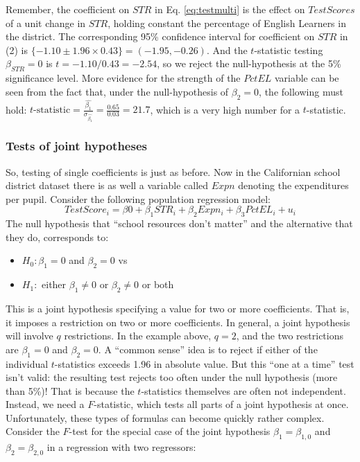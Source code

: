 \documentclass[
]{book}
\providecommand{\tightlist}{%
  \setlength{\itemsep}{0pt}\setlength{\parskip}{0pt}}
\begin{document}
Remember, the coefficient on \(STR\) in Eq. \eqref{eq:testmulti} is the effect on \(TestScores\) of a unit change in \(STR\), holding constant the percentage of English Learners in the district. The corresponding 95\% confidence interval for coefficient on \(STR\) in (2) is \(\{-1.10 \pm 1.96 \times 0.43\} = (-1.95,-0.26)\). And the \(t\)-statistic testing \(\beta_{STR} = 0\) is \(t = -1.10/0.43 = -2.54\), so we reject the null-hypothesis at the 5\% significance level. More evidence for the strength of the \(PctEL\) variable can be seen from the fact that, under the null-hypothesis of \(\beta_2 = 0\), the following must hold: \(t\text{-statistic} = \frac{\hat{\beta_1}}{\sigma_{\hat{\beta_1}}} = \frac{0.65}{0.03} = 21.7\), which is a very high number for a \(t\)-statistic.

\hypertarget{tests-of-joint-hypotheses}{%
\subsubsection{Tests of joint hypotheses}\label{tests-of-joint-hypotheses}}

So, testing of single coefficients is just as before. Now in the Californian school district dataset there is as well a variable called \(Expn\) denoting the expenditures per pupil. Consider the following population
regression model:
\begin{equation}
TestScore_i = \beta0 + \beta_1 STR_i + \beta_2 Expn_i + \beta_3PctEL_i + u_i
\end{equation}
The null hypothesis that ``school resources don't matter'' and the alternative that they do, corresponds to:

\begin{itemize}
\tightlist
\item
  \(H_0:\beta_1 =0\) and \(\beta_2 =0\) vs
\item
  \(H_1:\) either \(\beta_1 \neq 0\) or \(\beta_2 \neq 0\) or both
\end{itemize}

This is a joint hypothesis specifying a value for two or more coefficients. That is, it imposes a restriction on two or more coefficients. In general, a joint hypothesis will involve \(q\) restrictions. In the example above, \(q = 2\), and the two restrictions are \(\beta_1 = 0\) and \(\beta_2 = 0\). A ``common sense'' idea is to reject if either of the individual \(t\)-statistics exceeds 1.96 in absolute value. But this ``one at a time'' test isn't valid: the resulting test rejects too often under the null hypothesis (more than 5\%)! That is because the \(t\)-statistics themselves are often not independent. Instead, we need a \(F\)-statistic, which tests all parts of a joint hypothesis at once. Unfortunately, these types of formulas can become quickly rather complex. Consider the \(F\)-test for the special case of the joint hypothesis \(\beta_1 = \beta_{1,0}\) and \(\beta_2 = \beta_{2,0}\) in a regression with two regressors:
\end{document}
